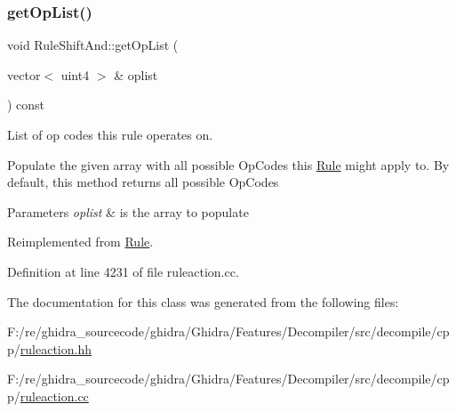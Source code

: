 \subsubsection{\texorpdfstring{getOpList()}{getOpList()}}
{\footnotesize\ttfamily void Rule\+Shift\+And\+::get\+Op\+List (\begin{DoxyParamCaption}\item[{vector$<$ uint4 $>$ \&}]{oplist }\end{DoxyParamCaption}) const\hspace{0.3cm}{\ttfamily [virtual]}}



List of op codes this rule operates on. 

Populate the given array with all possible Op\+Codes this \mbox{\hyperlink{class_rule}{Rule}} might apply to. By default, this method returns all possible Op\+Codes 
\begin{DoxyParams}{Parameters}
{\em oplist} & is the array to populate \\
\hline
\end{DoxyParams}


Reimplemented from \mbox{\hyperlink{class_rule_a4023bfc7825de0ab866790551856d10e}{Rule}}.



Definition at line 4231 of file ruleaction.\+cc.



The documentation for this class was generated from the following files\+:\begin{DoxyCompactItemize}
\item 
F\+:/re/ghidra\+\_\+sourcecode/ghidra/\+Ghidra/\+Features/\+Decompiler/src/decompile/cpp/\mbox{\hyperlink{ruleaction_8hh}{ruleaction.\+hh}}\item 
F\+:/re/ghidra\+\_\+sourcecode/ghidra/\+Ghidra/\+Features/\+Decompiler/src/decompile/cpp/\mbox{\hyperlink{ruleaction_8cc}{ruleaction.\+cc}}\end{DoxyCompactItemize}
